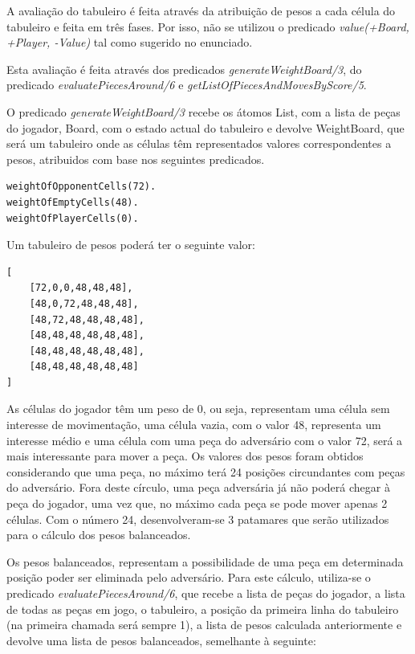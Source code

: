 \documentclass[paper=a4, fontsize=11pt]{scrartcl} %
\numberwithin{equation}{section} %
\numberwithin{figure}{section} %
\numberwithin{table}{section} %
\begin{document}
A avaliação do tabuleiro é feita através da atribuição de pesos a cada célula do tabuleiro e feita em três fases. Por isso, não se utilizou o predicado \textit{value(+Board, +Player, -Value)} tal como sugerido no enunciado.

Esta avaliação é feita através dos predicados \textit{generateWeightBoard/3}, do predicado \textit{evaluatePiecesAround/6} e \textit{getListOfPiecesAndMovesByScore/5}.

O predicado \textit{generateWeightBoard/3} recebe os átomos List, com a lista de peças do jogador, Board, com o estado actual do tabuleiro e devolve WeightBoard, que será um tabuleiro onde as células têm representados valores correspondentes a pesos, atribuidos com base nos seguintes predicados.

\begin{lstlisting}
weightOfOpponentCells(72).
weightOfEmptyCells(48).
weightOfPlayerCells(0).
\end{lstlisting}

Um tabuleiro de pesos poderá ter o seguinte valor:

\begin{lstlisting}
[
	[72,0,0,48,48,48],
	[48,0,72,48,48,48],
	[48,72,48,48,48,48],
	[48,48,48,48,48,48],
	[48,48,48,48,48,48],
	[48,48,48,48,48,48]
]
\end{lstlisting}

As células do jogador têm um peso de 0, ou seja, representam uma célula sem interesse de movimentação, uma célula vazia, com o valor 48, representa um interesse médio e uma célula com uma peça do adversário com o valor 72, será a mais interessante para mover a peça. Os valores dos pesos foram obtidos considerando que uma peça, no máximo terá 24 posições circundantes com peças do adversário. Fora deste círculo, uma peça adversária já não poderá chegar à peça do jogador, uma vez que, no máximo cada peça se pode mover apenas 2 células. Com o número 24, desenvolveram-se 3 patamares que serão utilizados para o cálculo dos pesos balanceados.

Os pesos balanceados, representam a possibilidade de uma peça em determinada posição poder ser eliminada pelo adversário. Para este cálculo, utiliza-se o predicado \textit{evaluatePiecesAround/6}, que recebe a lista de peças do jogador, a lista de todas as peças em jogo, o tabuleiro, a posição da primeira linha do tabuleiro (na primeira chamada será sempre 1), a lista de pesos calculada anteriormente e devolve uma lista de pesos balanceados, semelhante à seguinte:
\end{document}

